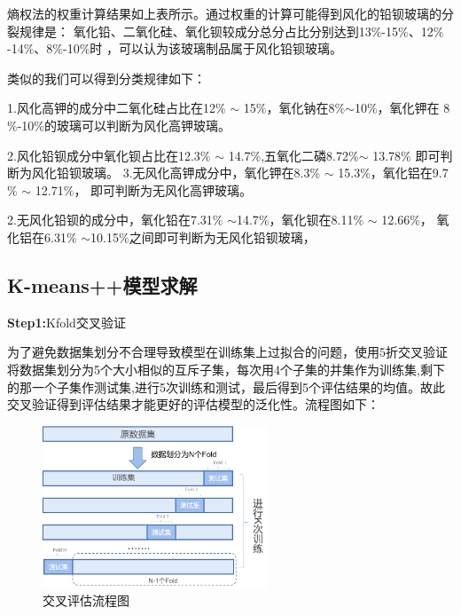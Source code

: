 \documentclass[UTF8]{ctexart}
\begin{document}
                熵权法的权重计算结果如上表所示。通过权重的计算可能得到风化的铅钡玻璃的分裂规律是：
                氧化铅、二氧化硅、氧化钡较成分总分占比分别达到13$\%$-15$\%$、12$\%$-14$\%$、8$\%$-10$\%$时
                ，可以认为该玻璃制品属于风化铅钡玻璃。

                类似的我们可以得到分类规律如下：

                1.风化高钾的成分中二氧化硅占比在12$\%$ $\sim$ 15$\%$，氧化钠在8$\%$$\sim$10$\%$，氧化钾在
            8$\%$-10$\%$的玻璃可以判断为风化高钾玻璃。

            2.风化铅钡成分中氧化钡占比在12.3$\%$ $\sim$ 14.7$\%$,五氧化二磷8.72$\%$$\sim$ 13.78$\%$
        即可判断为风化铅钡玻璃。
        3.无风化高钾成分中，氧化钾在8.3$\%$ $\sim$ 15.3$\%$，氧化铝在9.7$\%$ $\sim$ 12.71$\%$，
        即可判断为无风化高钾玻璃。

        2.无风化铅钡的成分中，氧化铅在7.31$\%$ $\sim$14.7$\%$，氧化钡在8.11$\%$ $\sim$ 12.66$\%$，
        氧化铝在6.31$\%$ $\sim$10.15$\%$之间即可判断为无风化铅钡玻璃，



        \subsection{K-means++模型求解}
        \textbf{Step1:}Kfold交叉验证

        为了避免数据集划分不合理导致模型在训练集上过拟合的问题，使用5折交叉验证将数据集划分为5个大小相似的互斥子集，每次用4个子集的并集作为训练集,剩下的那一个子集作测试集,进行5次训练和测试，最后得到5个评估结果的均值。故此交叉验证得到评估结果才能更好的评估模型的泛化性。流程图如下：

        \begin{figure}[H]\centering
            \includegraphics[width=0.6\textwidth,height=0.45\textwidth]{img/交叉评估流程图.png} %
            \caption{交叉评估流程图} %
            \label{fig:figure 6} %
        \end{figure}
\end{document}
